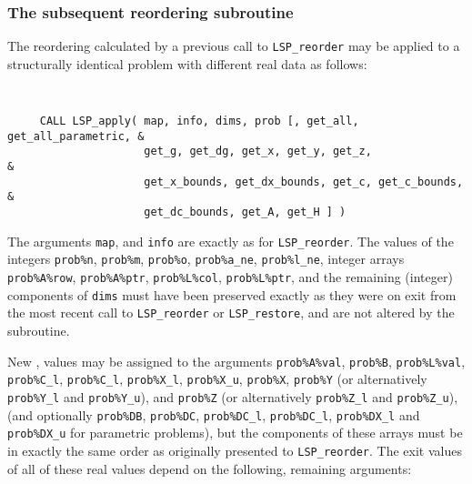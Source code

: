 \documentclass{galahad}
\newcommand{\packagename}{LSP}
\begin{document}

\subsubsection{The subsequent reordering subroutine}
The reordering calculated by a previous call to {\tt \packagename\_reorder} 
may be applied to a structurally identical problem with different real data 
as follows:

\vspace*{-2mm}
{\tt 
\begin{verbatim}
     CALL LSP_apply( map, info, dims, prob [, get_all, get_all_parametric, &
                     get_g, get_dg, get_x, get_y, get_z,                   &
                     get_x_bounds, get_dx_bounds, get_c, get_c_bounds,     &
                     get_dc_bounds, get_A, get_H ] )
\end{verbatim}
}
\vspace*{-1mm}
\noindent
The arguments {\tt map}, and {\tt info} are exactly as for 
{\tt \packagename\_reorder}. The values of the integers 
{\tt prob\%n}, {\tt prob\%m}, {\tt prob\%o}, 
{\tt prob\%a\_ne}, {\tt prob\%l\_ne},
integer arrays {\tt prob\%A\%row}, {\tt prob\%A\%ptr}, 
{\tt prob\%L\%col}, {\tt prob\%L\%ptr}, and the remaining (integer) 
components of {\tt dims} must 
have been preserved exactly as they were on exit from the most recent 
call to {\tt \packagename\_reorder} or {\tt \packagename\_restore}, 
and are not altered by the subroutine. 

New \realdp, values may be assigned to the arguments 
{\tt prob\%A\%val}, {\tt prob\%B}, {\tt prob\%L\%val}, {\tt prob\%C\_l}, 
{\tt prob\%C\_l}, {\tt prob\%X\_l}, {\tt prob\%X\_u}, {\tt prob\%X}, 
{\tt prob\%Y} 
(or alternatively {\tt prob\%Y\_l} and {\tt prob\%Y\_u}), 
and {\tt prob\%Z}
(or alternatively {\tt prob\%Z\_l} and {\tt prob\%Z\_u}), 
(and optionally 
{\tt prob\%DB}, {\tt prob\%DC}, {\tt prob\%DC\_l}, {\tt prob\%DC\_l}, 
{\tt prob\%DX\_l} and {\tt prob\%DX\_u} for parametric problems), 
but the components of these arrays 
must be in exactly the same order as originally presented to 
{\tt \packagename\_reorder}. 
The exit values of all of these real values depend on the following, 
remaining arguments: 
\end{document}
